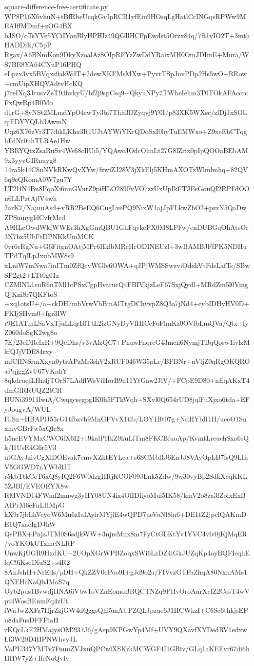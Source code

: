 \documentclass[11pt]{article}
\theoremstyle{definition}
\theoremstyle{remark}
\begin{document}
\begin{filecontents*}[overwrite]{square-difference-free-certificate.py}
WP8P16X6vhuN+tBfRbeUcqkGvIpRCB1yfEiu9HOsqLgHatlCcINGqsRPWw9MEAIffMDmf+zOG4BX
bJSO/oTsYVe5YCiIYonBlyHPHIz49QGIlHCFpEwdst5Orzx84q/7ft1vIO2T+3mthHADDrk/C5pP
Rgax/A6BNmKon9DkyXzoalAz8OIpRFYzZwDdYRaixMH0OmJDImE+Mura/WS7BE8YA64CNuP16PHQ
eLpzx3vx5BVqxs9akWdT+2dewXKFMsMXw+PyvrTSpJnvPDp2Hs5wO+RRow+cmUipXHQVAdtvHcKQ
j7reIXq3JrusvZeT94hvkyU/bf2j9spCsq9+QkyuNPy7TWbeIehm3T0TOkAFAccrcFxQwRp4B0Mo
d1rG+8yNSt2MLmdYpO4rwTy3bi7Thh3DZyqvj9Y0I/p83XK5WXsc/zlDjJxSOLqiEDYYQLh3AwmN
Uqz6X76zVr3T7dikLKhx3R1UJtAYWiYKrQDoSxI0hyTuEMWxo+Z9xeEbCTqghFdNr0uhTLRAe1Hw
YBRYQtxZsaRuSv4Ws68cIlUi5/YQAwcJOdcOlmLt27G8lZrix0pIpQOOaBEbAM9x3yyvGIRnuyg8
14ra5k44C8uNVkRKwQvXYw/fzwiZJ28V3jXkElj5KHmAXOTzWlmlmhq+82QV6q9eQKomA0W7gu7Y
LT2l4N4Bn8PqoXi6nnGVurZ9piHLO289FvVO7zzUxUpIkFTJEsGouQI2RPFdOOn6LLPztAjlV4wh
2arK7/NajuuAsd+vRR2BeEQ6CugLvePQ9NixW1ajJpFLkwZbO2+pzzN5QaDwZPSmnygldCvfrMcd
A9HLeOwdWkfWWEr3hXgGmQBU1GhFqykePX0M8LPFw/cnDUBGqOhAtsOr3N7bz5UbFtDPNKkUmMCK
0vr6cRgNu+G6FitgnOAtjMPr6HklbMRcHrODINEUzl+3wBAMBJFfPK5NDHuTPdTqlLpJxubMW8s9
xLniW7mNwa7inITm0ZfQcyWGlv6OWA+qJPjWMSSwzviOdxkVtFdsLafTs/SBwSP2gt2+LTt0g01z
CZMlNL1euR6nTMl1cPSxCgpHvarucQ4FBIVkjzLeF67SxjQydl+MRdZm5l0VmgQjKni8r7QKFtoS
+xq1otsU+/a+ckDH7mbVrwVbBmAlTtgDChyvpZ8Q3a7jNd4+cybIDHyHV0D+FKIjSHvm0+fgr3IW
r9E1ATmLSaVxTjuLLqrBlTtL2izGNyDyVfHICeFoFhnKz0OVfbLmQVa/Qtx+fyZ060doSgK2wg8o
7E/23cDRefxR+9QcDhs/v3vAlzQC7+PnuwFnqrcG43mcn6NymjTBqQosw1ivlzMkfQJjVDE84rxy
mfCHNSrmXxyn0ytrAPzMr3shV2xRUF046W35pLc/BFBNr+uVljZ0qRgOKQROaPqjggZvU67VKahY
8qkdruqfLHn4jTOrS7LAdflWsViHorB9n11YtGaw2JlV/+FCpE9D80+nEqAKxT4dmGfRRUQZ2tCR
HUNi39911lwiA/CwqgcsegpgIK0h5FTkWqh+SXvl0Q654rUD8jqlFuXjxo6tda+EFyJougvA/WUL
IUSx+HBAPlJ55cG1tfbzvh9MnGFVvX1tlb/LOY1Bt07g+NdHYbR1H/ueoO1SnxmvGBrFw5xQIc8x
h5neEVYMxCWC6fX6I2+t9kalPHkZ9kuLiTm8FKCBfuoAp/KvmtLreuchSxa6sQk/l1UsR4G6r5V3
utGAyJzivCgXlDOEvak7cmvXZktEYLca+s6SCMbRJ6EnJJ8VAyOpLB7fsQ9LIhV5GGWD7nYWbRIT
r5kbTtkCeT6xQ8yIQ2F6W0dzgHRjKCOF09JLnk5Zdw/9w30vyBp2SdkXcqKKL5ZJBf/EVEOEYX8w
RMVND14FWmf2mnwg3yHY08UN4ix4OfIDliyoMui5IK58/kmV2o8za3fZoixExBAIPrM6eFnLHMpG
kX9r7jbLhVcyqW6Mu6zIuIAyirMYjlE4wQPD7ueVoNl8ln6+DE1tZ2jpclQAKmDE1Q7xacIgDJhW
QsPBX+PnjzJTM0S6sdjkWW+3ujrsMnx8m7FyCtGLKtYv1YVC4vlv0jKjMqER/voYKOkUTxmeNLRP
UnwKjUGR9HxdKU+2UOpXGrWPBZoqxSWi6LzDZ4iGkJUZqKp4ayBQFIeqhElqC9iKsqDfuS2+s4R2
8AkJshH+NrEds/pDH+QkZZV0cPoo9I+gJd9o2a/FIVvzGTFaZhqA80NxnAMs1QNEHcNaQbJMoS7q
Oyb2pus1BvwdjHNA6iVbw1oVZnEomoBRQCTNZq9PHvOroAnrXcfZ2CosT4wVpt4WosBEumFq4zUt
iWaJwZXFz7HjrZzjGW4dQggsQhi5mAUPZQLJpzue6J1HCWkzI+C6Sc6thkjsEPu8daFusDFFPiaH
zKQcLkE2HMajysOM2l31J6/gAep9KPGwYp4Mf+UVY9QXavfXYDedRV1edxwLf3W20D4HPNWhvyJL
VaPU347YMTv7FnuuZVJxuQPCwlXSKrkMCWGF4I1GBiv/GLq1aKEEvr67di6hHHW7yZ+IfcNoQvIy

\end{filecontents*}
\end{document}
